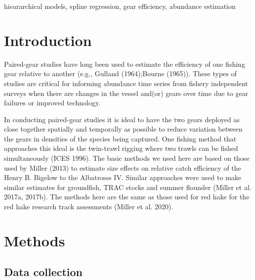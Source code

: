 \documentclass[]{article}
\begin{document}
hieararchical models, spline regression, gear efficiency, abundance
estimation

\pagebreak

\hypertarget{introduction}{%
\section{Introduction}\label{introduction}}

Paired-gear studies have long been used to estimate the efficiency of
one fishing gear relative to another (e.g., Gulland (1964);Bourne
(1965)). These types of studies are critical for informing abundance
time series from fishery independent surveys when there are changes in
the vessel and(or) gears over time due to gear failures or improved
technology.

In conducting paired-gear studies it is ideal to have the two gears
deployed as close together spatially and temporally as possible to
reduce variation between the gears in densities of the species being
captured. One fishing method that approaches this ideal is the
twin-trawl rigging where two trawls can be fished simultaneously (ICES
1996). The basic methods we used here are based on those used by Miller
(2013) to estimate size effects on relative catch efficiency of the
Henry B. Bigelow to the Albatrosss IV. Similar approaches were used to
make similar estimates for groundfish, TRAC stocks and summer flounder
(Miller et al. 2017a, 2017b). The methods here are the same as those
used for red hake for the red hake research track assessments (Miller et
al. 2020).

\hypertarget{methods}{%
\section{Methods}\label{methods}}

\hypertarget{data-collection}{%
\subsection{Data collection}\label{data-collection}}
\end{document}
